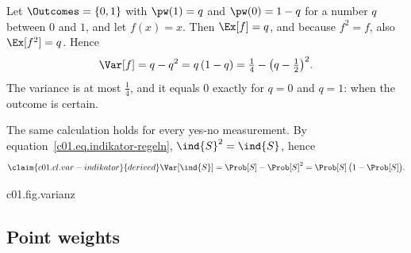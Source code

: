 \begin{example}\label{c01.ex.muenze}
  Let $\Outcomes = \{0, 1\}$ with $\pw(1) = q$ and $\pw(0) = 1 - q$ for a number $q$
  between $0$ and $1$, and let $f(x) = x$. Then $\Ex[f] = q$, and because $f^2 = f$,
  also $\Ex[f^2] = q$. Hence
  \begin{equation}\label{c01.eq.zwei-ergebnisse}
    \Var[f] = q - q^2 = q\,(1 - q) = \tfrac14 - \bigl(q - \tfrac12\bigr)^2 .
  \end{equation}
  The variance is at most $\tfrac14$, and it equals $0$ exactly for $q = 0$ and $q = 1$:
  when the outcome is certain.
\end{example}

The same calculation holds for every yes-no measurement. By
equation~\eqref{c01.eq.indikator-regeln}, $\ind{S}^2 = \ind{S}$, hence
\begin{equation}\label{c01.eq.var-indikator}\claim{c01.cl.var-indikator}{derived}
  \Var[\ind{S}] = \Prob[S] - \Prob[S]^2 = \Prob[S]\,\bigl(1 - \Prob[S]\bigr) .
\end{equation}

\begin{tpcfigure}{c01.fig.varianz}
  \caption{(a), (b) Two weights with the same expectation value $\tfrac72$ of the number of
    spots $f(x) = x$ (dashed line) and different variance: the fair die of
    equation~\eqref{c01.eq.varianz-fair} and a weight that lies half on $3$ and half on
    $4$; for the latter $\Ex[f^2] = \tfrac{9 + 16}{2}$ and
    $\Var[f] = \tfrac{25}{2} - \tfrac{49}{4} = \tfrac14$. (c) The variance
    of a yes-no measurement as a function of $q = \Prob[S]$ by
    equation~\eqref{c01.eq.var-indikator}: it vanishes exactly at the two ends, where
    the answer is certain, and is largest at $q = \tfrac12$.}
\end{tpcfigure}

\subsection{Point weights}\label{c01.s3.1}

